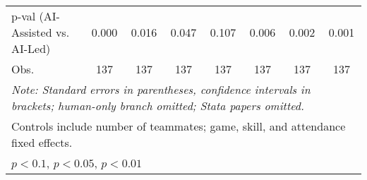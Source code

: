 \begin{tabular}{l*{7}{c}}
p-val (AI-Assisted vs. AI-Led)&       0.000   &       0.016   &       0.047   &       0.107   &       0.006   &       0.002   &       0.001   \\
Obs.                &         137   &         137   &         137   &         137   &         137   &         137   &         137   \\
\hline\hline
\multicolumn{8}{l}{\it{Note:} Standard errors in 
parentheses, confidence intervals in brackets; 
human-only branch omitted; 
Stata papers omitted.}\\
\multicolumn{8}{l}{Controls include number of teammates; 
game, skill, and attendance fixed effects.}\\
\multicolumn{8}{l}{\sym{*} \(p<0.1\), \sym{**} \(p<0.05\), 
\sym{***} \(p<0.01\)}\\
\end{tabular}
